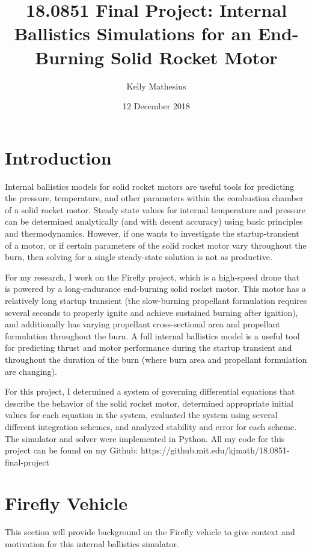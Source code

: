 \documentclass[12pt, letterpaper]{article}
\title{18.0851 Final Project: Internal Ballistics Simulations for an End-Burning Solid Rocket Motor}
\author{Kelly Mathesius}
\date{12 December 2018}
\begin{document}
 
\maketitle
 
\section{Introduction}

Internal ballistics models for solid rocket motors are useful tools for predicting the pressure, temperature, and other parameters within the combustion chamber of a solid rocket motor. Steady state values for internal temperature and pressure can be determined analytically (and with decent accuracy) using basic principles and thermodynamics. However, if one wants to investigate the startup-transient of a motor, or if certain parameters of the solid rocket motor vary throughout the burn, then solving for a single steady-state solution is not as productive.

For my research, I work on the Firefly project, which is a high-speed drone that is powered by a long-endurance end-burning solid rocket motor. This motor has a relatively long startup transient (the slow-burning propellant formulation requires several seconds to properly ignite and achieve sustained burning after ignition), and additionally has varying propellant cross-sectional area and propellant formulation throughout the burn. A full internal ballistics model is a useful tool for predicting thrust and motor performance during the startup transient and throughout the duration of the burn (where burn area and propellant formulation are changing). 

For this project, I determined a system of governing differential equations that describe the behavior of the solid rocket motor, determined appropriate initial values for each equation in the system, evaluated the system using several different integration schemes, and analyzed stability and error for each scheme. The simulator and solver were implemented in Python. All my code for this project can be found on my Github: https://github.mit.edu/kjmath/18.0851-final-project

\section{Firefly Vehicle}

This section will provide background on the Firefly vehicle to give context and motivation for this internal ballistics simulator.
\end{document}

